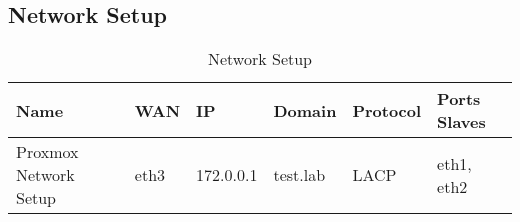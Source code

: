 \subsection{Network Setup}
\begin{table}[h]	
	\begin{tabular}{l|l|l|l|l|l}
		\textbf{Name}         & \textbf{WAN} & \textbf{IP} & \textbf{Domain} & \textbf{Protocol} & \textbf{Ports Slaves}  \\ \hline
		Proxmox Network Setup & eth3         & 172.0.0.1   & test.lab        & LACP  			& eth1, eth2           
	\end{tabular}
	\caption{Network Setup}
	\label{Tbl_Network Setup}
\end{table}
\newpage


